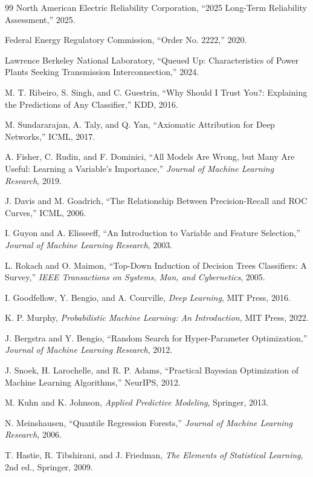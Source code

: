 \documentclass[11pt]{article}
\begin{document}
\begin{thebibliography}{99}
North American Electric Reliability Corporation, ``2025 Long-Term Reliability Assessment,'' 2025.

Federal Energy Regulatory Commission, ``Order No. 2222,'' 2020.

Lawrence Berkeley National Laboratory, ``Queued Up: Characteristics of Power Plants Seeking Transmission Interconnection,'' 2024.

M. T. Ribeiro, S. Singh, and C. Guestrin, ``Why Should I Trust You?: Explaining the Predictions of Any Classifier,'' KDD, 2016.

M. Sundararajan, A. Taly, and Q. Yan, ``Axiomatic Attribution for Deep Networks,'' ICML, 2017.

A. Fisher, C. Rudin, and F. Dominici, ``All Models Are Wrong, but Many Are Useful: Learning a Variable's Importance,'' \textit{Journal of Machine Learning Research}, 2019.

J. Davis and M. Goadrich, ``The Relationship Between Precision-Recall and ROC Curves,'' ICML, 2006.

I. Guyon and A. Elisseeff, ``An Introduction to Variable and Feature Selection,'' \textit{Journal of Machine Learning Research}, 2003.

L. Rokach and O. Maimon, ``Top-Down Induction of Decision Trees Classifiers: A Survey,'' \textit{IEEE Transactions on Systems, Man, and Cybernetics}, 2005.

I. Goodfellow, Y. Bengio, and A. Courville, \textit{Deep Learning}, MIT Press, 2016.

K. P. Murphy, \textit{Probabilistic Machine Learning: An Introduction}, MIT Press, 2022.

J. Bergstra and Y. Bengio, ``Random Search for Hyper-Parameter Optimization,'' \textit{Journal of Machine Learning Research}, 2012.

J. Snoek, H. Larochelle, and R. P. Adams, ``Practical Bayesian Optimization of Machine Learning Algorithms,'' NeurIPS, 2012.

M. Kuhn and K. Johnson, \textit{Applied Predictive Modeling}, Springer, 2013.

N. Meinshausen, ``Quantile Regression Forests,'' \textit{Journal of Machine Learning Research}, 2006.

T. Hastie, R. Tibshirani, and J. Friedman, \textit{The Elements of Statistical Learning}, 2nd ed., Springer, 2009.


\end{thebibliography}
\end{document}
